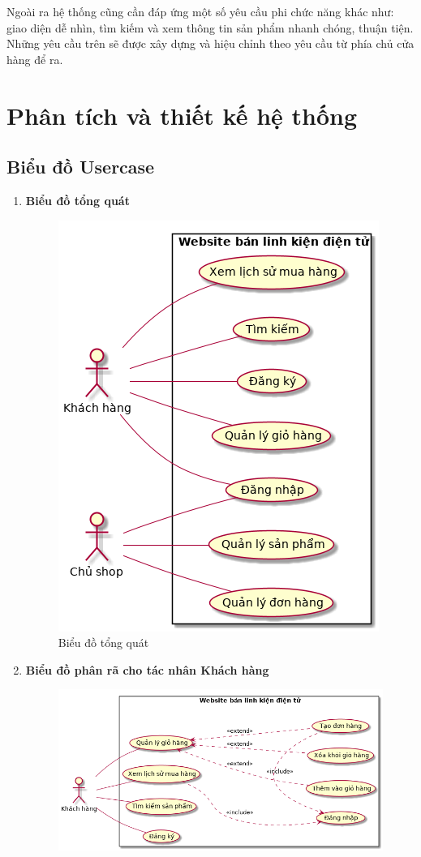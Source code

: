 Ngoài ra hệ thống cũng cần đáp ứng một số yêu cầu phi chức năng khác như: giao diện dễ nhìn, tìm kiếm và xem thông tin sản phẩm nhanh chóng, thuận tiện. Những yêu cầu trên sẽ được xây dựng và hiệu chỉnh theo yêu cầu từ phía chủ cửa hàng để ra.
\section{Phân tích và thiết kế hệ thống}
\subsection{Biểu đồ Usercase}
\begin{enumerate}[label=\textbf{\alph*)}]
\item \textbf{Biểu đồ tổng quát}
    \begin{figure}[h!]
        \centering
        \includegraphics[scale=0.7]{fig/uc_all.png}
        \caption{Biểu đồ tổng quát}
    \end{figure}
\newpage
\item \textbf{Biểu đồ phân rã cho tác nhân Khách hàng}
    \begin{figure}[h!]
        \centering
        \includegraphics[scale=0.6]{fig/uc_user.png}

\end{figure}
\end{enumerate}
